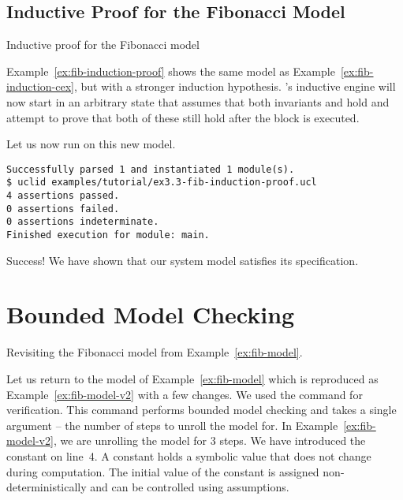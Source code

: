 \subsection{Inductive Proof for the Fibonacci Model}

\begin{uclidlisting}[htbp]
    
    \caption{Inductive proof for the Fibonacci model}
    \label{ex:fib-induction-proof}
\end{uclidlisting}

Example~\ref{ex:fib-induction-proof} shows the same model as Example~\ref{ex:fib-induction-cex}, but with a stronger induction hypothesis. \uclid{}'s inductive engine will now start in an arbitrary state that assumes that both invariants  and  hold and attempt to prove that both of these still hold after the  block is executed.

Let us now run \uclid{} on this new model.

\begin{Verbatim}[frame=single, samepage=true]
Successfully parsed 1 and instantiated 1 module(s).
$ uclid examples/tutorial/ex3.3-fib-induction-proof.ucl 
4 assertions passed.
0 assertions failed.
0 assertions indeterminate.
Finished execution for module: main.
\end{Verbatim}

Success! We have shown that our system model satisfies its specification.

\section{Bounded Model Checking}

\begin{uclidlisting}[htbp]
    
    \caption{Revisiting the Fibonacci model from Example~\ref{ex:fib-model}.}
    \label{ex:fib-model-v2}
\end{uclidlisting}

Let us return to the model of Example~\ref{ex:fib-model} which is reproduced as Example~\ref{ex:fib-model-v2} with a few changes. We used the  command for verification. This command performs bounded model checking and takes a single argument -- the number of steps to unroll the model for. In Example~\ref{ex:fib-model-v2}, we are unrolling the model for 3 steps. We have introduced the constant  on line~4. A constant holds a symbolic value that does not change during computation. The initial value of the constant is assigned non-deterministically and can be controlled using assumptions.

